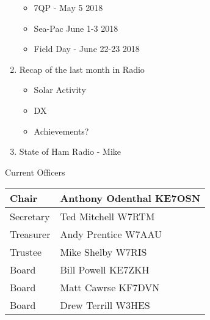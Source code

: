 \documentclass[letter,11pt]{extarticle}
\begin{document}
\begin{enumerate}
\begin{itemize}
				\item 7QP - May 5 2018
				\item Sea-Pac June 1-3 2018
				\item Field Day - June 22-23 2018
			\end{itemize}
		\item Recap of the last month in Radio
			\begin{itemize}
				\item Solar Activity
				\item DX
				\item Achievements?
			\end{itemize}
		\item  State of Ham Radio - Mike
	\end{enumerate}


	Current Officers \\
	\begin{tabular}{|l|l|} \hline
		Chair & Anthony Odenthal KE7OSN \\ \hline
		Secretary & Ted Mitchell W7RTM \\ \hline
		Treasurer & Andy Prentice W7AAU \\ \hline
		Trustee & Mike Shelby W7RIS   \\ \hline
		Board & Bill Powell KE7ZKH \\ \hline
		Board & Matt Cawrse KF7DVN \\ \hline
		Board & Drew Terrill W3HES\\ \hline
	\end{tabular}
	
	\subsection*{}
	
\end{document}
